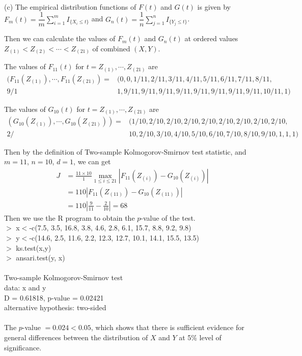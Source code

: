 \documentclass[12pt,a4paper]{article}
\begin{document}
~\\
(c) The empirical distribution functions of $F(t)$ and $G(t)$ is given by $F_{m}(t)=\dfrac{1}{m}\sum_{i=1}^{m}I_{\{X_{i}\leqslant t\}}$ and $G_{n}(t)=\dfrac{1}{n}\sum_{j=1}^{n}I_{\{Y_{j}\leqslant t\}}$. 

Then we can calculate the values of $F_{m}(t)$ and $G_{n}(t)$ at ordered values $Z_{(1)}<Z_{(2)}<\cdots<Z_{(21)}$ of combined $(X,Y)$.

The values of $F_{11}(t)$ for $t=Z_{(1)},\cdots,Z_{(21)}$ are
\begin{align*}
(F_{11}(Z_{(1)}),\cdots,F_{11}(Z_{(21)})=&(0,0,1/11,2/11,3/11,4/11,5/11,6/11,7/11,8/11,\\
9/1&1,9/11,9/11,9/11,9/11,9/11,9/11,9/11,9/11,10/11,1)
\end{align*}

The values of $G_{10}(t)$ for $t=Z_{(1)},\cdots,Z_{(21)}$ are
\begin{align*}
(G_{10}(Z_{(1)}),\cdots,G_{10}(Z_{(21)}))=&(1/10,2/10,2/10,2/10,2/10,2/10,2/10,2/10,2/10,\\
2/&10,2/10,3/10,4/10,5/10,6/10,7/10,8/10,9/10,1,1,1)
\end{align*}

Then by the definition of Two-sample Kolmogorov-Smirnov test statistic, and $m=11$, $n=10$, $d=1$, we can get
\begin{align*}
J&=\frac{11\times 10}{1}\max_{1\leqslant i\leqslant 21}|F_{11}(Z_{(i)})-G_{10}(Z_{(i)})|\\&=110|F_{11}(Z_{(11)})-G_{10}(Z_{(11)})|\\&=110\left|\frac{9}{11}-\frac{2}{10}\right|=68
\end{align*}
Then we use the R program to obtain the $p$-value of the test.\\

$>$ x$<$-c(7.5, 3.5, 16.8, 3.8, 4.6, 2.8, 6.1, 15.7, 8.8, 9.2, 9.8)\\
\indent $>$ y$<$-c(14.6, 2.5, 11.6, 2.2, 12.3, 12.7, 10.1, 14.1, 15.5, 13.5)\\
\indent $>$ ks.test(x,y)\\
\indent $>$ ansari.test(y, x)\\
~\\
\indent\indent\indent\indent\indent\indent Two-sample Kolmogorov-Smirnov test\\
\indent data: x and y\\
\indent D = 0.61818, p-value = 0.02421\\
\indent alternative hypothesis: two-sided\\
~\\
The $p$-value $=0.024<0.05$, which shows that there is sufficient evidence for general differences between the distribution of $X$ and $Y$ at 5\% level of significance.
\end{document}
